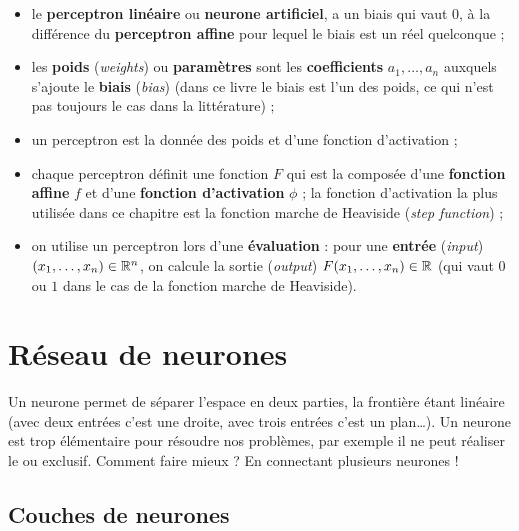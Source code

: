 \begin{itemize}
	\item le \textbf{perceptron linéaire} ou \textbf{neurone artificiel}, a un biais qui vaut $0$, à la différence du \textbf{perceptron affine} pour lequel le biais est un réel quelconque ;
	
	\item les \textbf{poids} (\emph{weights}) ou \textbf{paramètres} sont les \textbf{coefficients} $a_1,\ldots,a_n$ auxquels s'ajoute le \textbf{biais} (\emph{bias}) (dans ce livre le biais est l'un des poids, ce qui n'est pas toujours le cas dans la littérature) ;
	
	\item un perceptron est la donnée des poids et d'une fonction d'activation ;
	
	\item chaque perceptron définit une fonction $F$ qui est la composée d'une \textbf{fonction affine} $f$ et d'une \textbf{fonction d'activation} $\phi$ ; 
	la fonction d'activation la plus utilisée dans ce chapitre est la fonction marche de Heaviside (\emph{step function}) ; 
	
	\item on utilise un perceptron lors d'une \textbf{évaluation} : pour une \textbf{entrée} (\emph{input})
	$(x_1,\ldots,x_n) \in \mathbb{R}^n$, on calcule la sortie (\emph{output}) $F(x_1,\ldots,x_n) \in \mathbb{R}$ (qui vaut $0$ ou $1$ dans le cas de la fonction marche de Heaviside).  
\end{itemize}




\section{Réseau de neurones}

Un neurone permet de séparer l'espace en deux parties, la frontière étant linéaire (avec deux entrées c'est une droite, avec trois entrées c'est un plan\ldots). Un neurone est trop élémentaire pour résoudre nos problèmes, par exemple il ne peut réaliser le \og{}ou exclusif\fg{}. Comment faire mieux ? En connectant plusieurs neurones !

\subsection{Couches de neurones}

